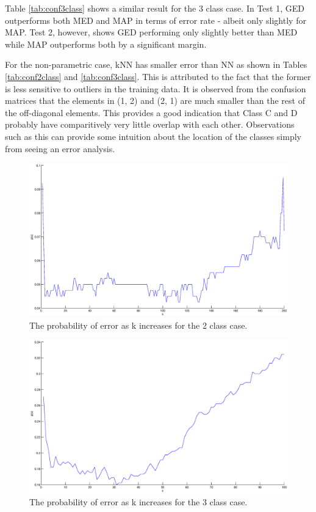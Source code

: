 Table \ref{tab:conf3class} shows a similar result for the 3 class case. In Test
1, GED outperforms both MED and MAP in terms of error rate - albeit only
slightly for MAP. Test 2, however, shows GED performing only slightly better
than MED while MAP outperforms both by a significant margin.

For the non-parametric case, kNN has smaller error than NN as shown in Tables
\ref{tab:conf2class} and \ref{tab:conf3class}. This is attributed to the fact that the
former is less sensitive to outliers in the training data. It is observed from the confusion matrices that the elements in
(1, 2) and (2, 1) are much smaller than the rest of the off-diagonal elements. 
This provides a good indication that Class C and D probably have comparitively 
very little overlap with each other.  Observations such as this can provide
some intuition about the location of the classes simply from seeing an error analysis.

\begin{figure}
  \begin{center}
  	\label{fig:2err}  
    \caption{The probability of error as k increases for the 2 class case.}
    \includegraphics[width=15cm]{figures/2-err}
  \end{center}
\end{figure}

\begin{figure}
  \begin{center}
  	\label{fig:3err}  
    \caption{The probability of error as k increases for the 3 class case.}
    \includegraphics[width=15cm]{figures/3-err}
  \end{center}
\end{figure}

